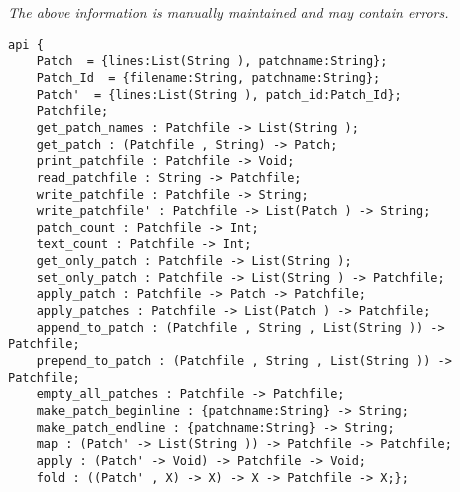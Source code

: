 \label{api:Patchfile}

{\tiny \it The above information is manually maintained and may contain errors.}
\begin{verbatim}
api {
    Patch  = {lines:List(String ), patchname:String};
    Patch_Id  = {filename:String, patchname:String};
    Patch'  = {lines:List(String ), patch_id:Patch_Id};
    Patchfile;
    get_patch_names : Patchfile -> List(String );
    get_patch : (Patchfile , String) -> Patch;
    print_patchfile : Patchfile -> Void;
    read_patchfile : String -> Patchfile;
    write_patchfile : Patchfile -> String;
    write_patchfile' : Patchfile -> List(Patch ) -> String;
    patch_count : Patchfile -> Int;
    text_count : Patchfile -> Int;
    get_only_patch : Patchfile -> List(String );
    set_only_patch : Patchfile -> List(String ) -> Patchfile;
    apply_patch : Patchfile -> Patch -> Patchfile;
    apply_patches : Patchfile -> List(Patch ) -> Patchfile;
    append_to_patch : (Patchfile , String , List(String )) -> Patchfile;
    prepend_to_patch : (Patchfile , String , List(String )) -> Patchfile;
    empty_all_patches : Patchfile -> Patchfile;
    make_patch_beginline : {patchname:String} -> String;
    make_patch_endline : {patchname:String} -> String;
    map : (Patch' -> List(String )) -> Patchfile -> Patchfile;
    apply : (Patch' -> Void) -> Patchfile -> Void;
    fold : ((Patch' , X) -> X) -> X -> Patchfile -> X;};
\end{verbatim}
